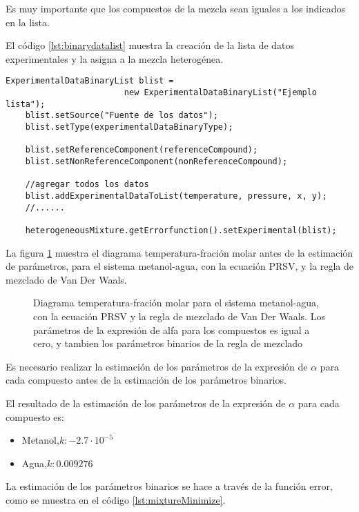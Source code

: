 	Es muy importante que los compuestos de la mezcla sean iguales a los indicados en la lista.

	El código \ref{lst:binarydatalist} muestra la creación de la lista de datos experimentales y la asigna a la mezcla heterogénea.

\begin{lstlisting}[caption={Creación de la lista de datos experimentales y la asignación de esta a la mezcla heterogénea.},label={lst:binarydatalist}]
	ExperimentalDataBinaryList blist = 
						new ExperimentalDataBinaryList("Ejemplo lista");
	blist.setSource("Fuente de los datos");
	blist.setType(experimentalDataBinaryType);

	blist.setReferenceComponent(referenceCompound);
	blist.setNonReferenceComponent(nonReferenceCompound);

	//agregar todos los datos 
	blist.addExperimentalDataToList(temperature, pressure, x, y);
	//......

	heterogeneousMixture.getErrorfunction().setExperimental(blist);
\end{lstlisting}


	La figura \ref{fig:binarybefore} muestra el diagrama temperatura-fración molar antes de la estimación de parámetros, para el sistema metanol-agua, con la ecuación PRSV, y la regla de mezclado de Van Der Waals.

\begin{figure}[!h]
	\centering
	\caption{Diagrama temperatura-fración molar para el sistema metanol-agua, con la ecuación PRSV y la regla de mezclado de Van Der Waals. Los parámetros de la expresión de alfa para los compuestos es igual a cero, y tambien los parámetros binarios de la regla de mezclado}\label{fig:binarybefore}
\end{figure}

	Es necesario realizar la estimación de los parámetros de la expresión de $\alpha$ para cada compuesto antes de la estimación de los parámetros binarios.

	El resultado de la estimación de los parámetros de la expresión de $\alpha$ para cada compuesto es:
\begin{itemize}
	\item Metanol,$ k: -2.7 \cdot 10^{-5}$
	\item Agua,$ k: 0.009276$
\end{itemize}

	La estimación de los parámetros binarios se hace a través de la función error, como se muestra en el código \ref{lst:mixtureMinimize}.

